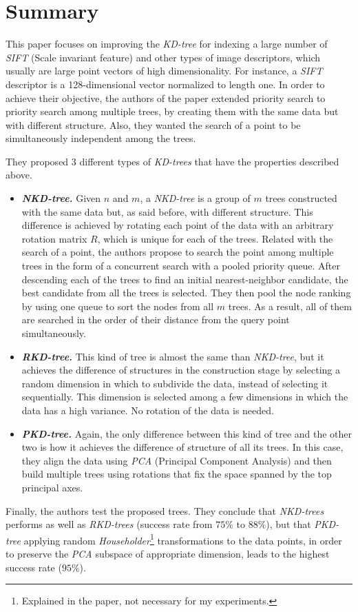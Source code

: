 \section{Summary}
This paper focuses on improving the \textit{KD-tree} for indexing a large number of \textit{SIFT} (Scale invariant feature) and other types of image descriptors, which usually are large point vectors of high dimensionality. For instance, a \textit{SIFT} descriptor is a 128-dimensional vector normalized to length one. In order to achieve their objective, the authors of the paper extended priority search to priority search among multiple trees, by creating them with the same data but with different structure. Also, they wanted the search of a point to be simultaneously independent among the trees.

They proposed 3 different types of \textit{KD-trees} that have the properties described above.
\begin{itemize}
    \item \textit{\textbf{NKD-tree.}} Given $n$ and $m$, a \textit{NKD-tree} is a group of $m$ trees constructed with the same data but, as said before, with different structure. This difference is achieved by rotating each point of the data with an arbitrary rotation matrix $R$, which is unique for each of the trees. Related with the search of a point, the authors propose to search the point among multiple trees in the form of a concurrent search with a pooled priority queue. After descending each of the trees to find an initial nearest-neighbor candidate, the best candidate from all the trees is selected. They then pool the node ranking by using one queue to sort the nodes from all $m$ trees. As a result, all of them are searched in the order of their distance from the query point simultaneously.
    \item \textit{\textbf{RKD-tree.}} This kind of tree is almost the same than \textit{NKD-tree}, but it achieves the difference of structures in the construction stage by selecting a random dimension in which to subdivide the data, instead of selecting it sequentially. This dimension is selected among a few dimensions in which the data has a high variance. No rotation of the data is needed.
    \item \textit{\textbf{PKD-tree.}} Again, the only difference between this kind of tree and the other two is how it achieves the difference of structure of all its trees. In this case, they align the data using \textit{PCA} (Principal Component Analysis) and then build multiple trees using rotations that fix the space spanned by the top principal axes.
\end{itemize}

Finally, the authors test the proposed trees. They conclude that \textit{NKD-trees} performs as well as \textit{RKD-trees} (success rate from $75\%$ to $88\%$), but that \textit{PKD-tree} applying random \textit{Householder}\footnote{Explained in the paper, not necessary for my experiments.} transformations to the data points, in order to preserve the \textit{PCA} subspace of appropriate dimension, leads to the highest success rate ($95\%$).